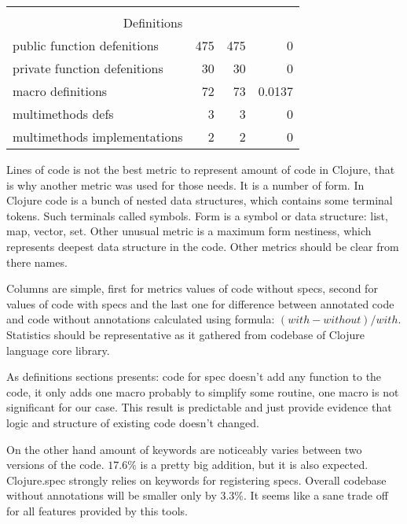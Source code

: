 \begin{table}[]
\begin{tabular}{lrrr}
                                                   & \multicolumn{1}{l}{}         & \multicolumn{1}{l}{}       & \multicolumn{1}{l}{}          \\
\multicolumn{4}{c}{Definitions}                                                                                                                \\ \hline
\multicolumn{1}{|l|}{public function defenitions}  & \multicolumn{1}{r|}{475}     & \multicolumn{1}{r|}{475}   & \multicolumn{1}{r|}{0}        \\ \hline
\multicolumn{1}{|l|}{private function defenitions} & \multicolumn{1}{r|}{30}      & \multicolumn{1}{r|}{30}    & \multicolumn{1}{r|}{0}        \\ \hline
\multicolumn{1}{|l|}{macro definitions}            & \multicolumn{1}{r|}{72}      & \multicolumn{1}{r|}{73}    & \multicolumn{1}{r|}{0.0137}   \\ \hline
\multicolumn{1}{|l|}{multimethods defs}            & \multicolumn{1}{r|}{3}       & \multicolumn{1}{r|}{3}     & \multicolumn{1}{r|}{0}        \\ \hline
\multicolumn{1}{|l|}{multimethods implementations} & \multicolumn{1}{r|}{2}       & \multicolumn{1}{r|}{2}     & \multicolumn{1}{r|}{0}        \\ \hline
\end{tabular}
\end{table}

Lines of code is not the best metric to represent amount of code in Clojure,
that is why another metric was used for those needs. It is a number of form. In
Clojure code is a bunch of nested data structures, which contains some terminal
tokens. Such terminals called symbols. Form is a symbol or data structure: list,
map, vector, set. Other unusual metric is a maximum form nestiness, which
represents deepest data structure in the code. Other metrics should be clear
from there names.

Columns are simple, first for metrics values of code without specs, second for
values of code with specs and the last one for difference between annotated code
and code without annotations calculated using formula: $(with - without)/with$.
Statistics should be representative as it gathered from codebase of Clojure
language core library.

As definitions sections presents: code for spec doesn't add any function to the
code, it only adds one macro probably to simplify some routine, one macro is not
significant for our case. This result is predictable and just provide evidence
that logic and structure of existing code doesn't changed.

On the other hand amount of keywords are noticeably varies between two versions
of the code. $17.6\%$ is a pretty big addition, but it is also expected.
Clojure.spec strongly relies on keywords for registering specs. Overall codebase
without annotations will be smaller only by $3.3\%$. It seems like a sane trade
off for all features provided by this tools.
